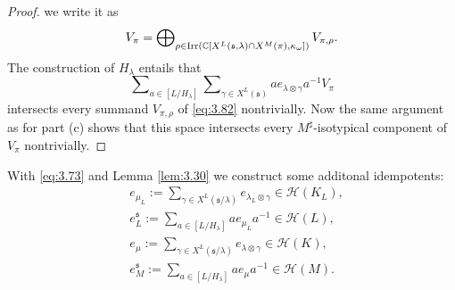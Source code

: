 \documentclass[11pt]{amsart}
\theoremstyle{definition}
\begin{document}
\begin{proof}
we write it as \label{i:63}
\begin{equation}\label{eq:3.82}
V_\pi = \bigoplus\nolimits_{\rho\in {{\rm Irr}} ({\mathbb C}[X^L ({{\mathfrak s}},\lambda) \cap X^M (\pi), 
\kappa_\omega])} V_{\pi,\rho} .
\end{equation}
The construction of $H_\lambda$ entails that 
\[
\sum\nolimits_{a \in [L / H_\lambda]} \sum\nolimits_{\gamma \in X^L ({{\mathfrak s}})}
a e_{\lambda \otimes \gamma} a^{-1} V_\pi
\]
intersects every summand $V_{\pi,\rho}$ of \eqref{eq:3.82} nontrivially. 
Now the same argument as for part (c) shows that this space intersects every
$M^\sharp$-isotypical component of $V_\pi$ nontrivially.
\end{proof}

With \eqref{eq:3.73} and Lemma \ref{lem:3.30} we construct some additonal idempotents:
\label{i:04}\label{i:10}\label{i:12}\label{i:13}
\begin{equation}\label{eq:3.61}
\begin{aligned}
& e_{\mu_L} := \sum\nolimits_{\gamma \in X^L ({{\mathfrak s}} / \lambda)}
e_{\lambda_L \otimes \gamma} \in {{\mathcal H}} (K_L), \\
& e^{{\mathfrak s}}_L := \sum\nolimits_{a \in [L / H_\lambda]} a e_{\mu_L} a^{-1} \in {{\mathcal H}} (L) , \\
& e_\mu := \sum\nolimits_{\gamma \in X^L ({{\mathfrak s}} / \lambda)}
e_{\lambda \otimes \gamma} \in {{\mathcal H}} (K), \\
& e^{{\mathfrak s}}_M := \sum\nolimits_{a \in [L / H_\lambda]} a e_\mu a^{-1} \in {{\mathcal H}} (M).
\end{aligned}
\end{equation}
\end{document}
